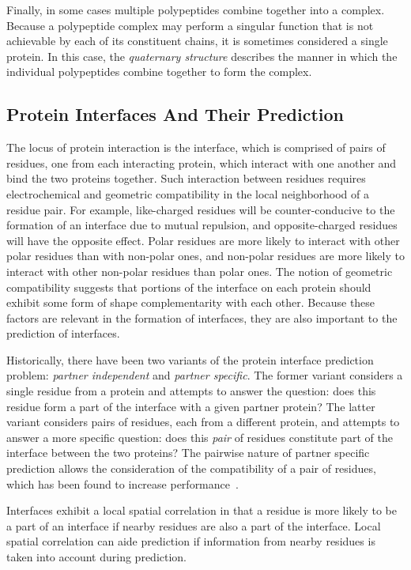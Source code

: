 Finally, in some cases multiple polypeptides combine together into a complex.
Because a polypeptide complex may perform a singular function that is not achievable by each of its constituent chains, it is sometimes considered a single protein.
In this case, the \textit{quaternary structure} describes the manner in which the individual polypeptides combine together to form the complex. 


\subsection{Protein Interfaces And Their Prediction}


The locus of protein interaction is the interface, which is comprised of pairs of residues, one from each interacting protein, which interact with one another and bind the two proteins together.
Such interaction between residues requires electrochemical and geometric compatibility in the local neighborhood of a residue pair.
For example, like-charged residues will be counter-conducive to the formation of an interface due to mutual repulsion, and opposite-charged residues will have the opposite effect.
Polar residues are more likely to interact with other polar residues than with non-polar ones, and non-polar residues are more likely to interact with other non-polar residues than polar ones.
The notion of geometric compatibility suggests that portions of the interface on each protein should exhibit some form of shape complementarity with each other. 
Because these factors are relevant in the formation of interfaces, they are also important to the prediction of interfaces.

Historically, there have been two variants of the protein interface prediction problem: \textit{partner independent} and \textit{partner specific}.
The former variant considers a single residue from a protein and attempts to answer the question: does this residue form a part of the interface with a given partner protein?
The latter variant considers pairs of residues, each from a different protein, and attempts to answer a more specific question: does this \textit{pair} of residues constitute part of the interface between the two proteins?
The pairwise nature of partner specific prediction allows the consideration of the compatibility of a pair of residues, which has been found to increase performance~\cite{ahmad2011}.

Interfaces exhibit a local spatial correlation in that a residue is more likely to be a part of an interface if nearby residues are also a part of the interface. 
Local spatial correlation can aide prediction if information from nearby residues is taken into account during prediction.

